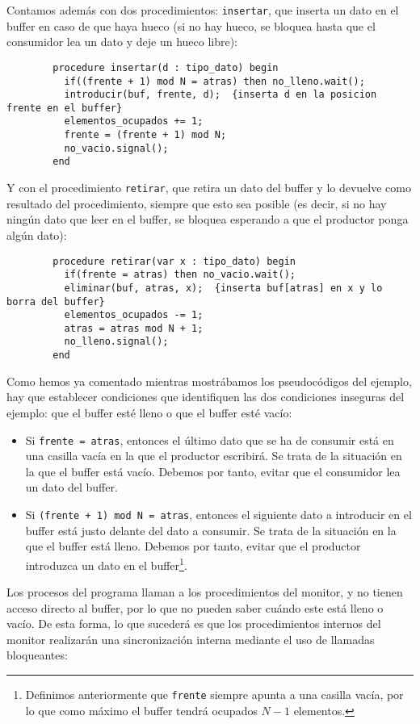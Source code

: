 \begin{ejemplo}
    Contamos además con dos procedimientos: \verb|insertar|, que inserta un dato en el buffer en caso de que haya hueco (si no hay hueco, se bloquea hasta que el consumidor lea un dato y deje un hueco libre):
    \begin{verbatim}
        procedure insertar(d : tipo_dato) begin
          if((frente + 1) mod N = atras) then no_lleno.wait();
          introducir(buf, frente, d);  {inserta d en la posicion frente en el buffer}
          elementos_ocupados += 1;
          frente = (frente + 1) mod N;
          no_vacio.signal();
        end
    \end{verbatim}
    Y con el procedimiento \verb|retirar|, que retira un dato del buffer y lo devuelve como resultado del procedimiento, siempre que esto sea posible (es decir, si no hay ningún dato que leer en el buffer, se bloquea esperando a que el productor ponga algún dato):
    \begin{verbatim}
        procedure retirar(var x : tipo_dato) begin
          if(frente = atras) then no_vacio.wait();
          eliminar(buf, atras, x);  {inserta buf[atras] en x y lo borra del buffer}
          elementos_ocupados -= 1;
          atras = atras mod N + 1;
          no_lleno.signal();
        end
    \end{verbatim}
    Como hemos ya comentado mientras mostrábamos los pseudocódigos del ejemplo, hay que establecer condiciones que identifiquen las dos condiciones inseguras del ejemplo: que el buffer esté lleno o que el buffer esté vacío:
    \begin{itemize}
        \item Si \verb|frente = atras|, entonces el último dato que se ha de consumir está en una casilla vacía en la que el productor escribirá. Se trata de la situación en la que el buffer está vacío. Debemos por tanto, evitar que el consumidor lea un dato del buffer.
        \item Si \verb|(frente + 1) mod N = atras|, entonces el siguiente dato a introducir en el buffer está justo delante del dato a consumir. Se trata de la situación en la que el buffer está lleno. Debemos por tanto, evitar que el productor introduzca un dato en el buffer\footnote{Definimos anteriormente que \texttt{frente} siempre apunta a una casilla vacía, por lo que como máximo el buffer tendrá ocupados $N-1$ elementos.}.
    \end{itemize}
    Los procesos del programa llaman a los procedimientos del monitor, y no tienen acceso directo al buffer, por lo que no pueden saber cuándo este está lleno o vacío. De esta forma, lo que sucederá es que los procedimientos internos del monitor realizarán una sincronización interna mediante el uso de llamadas bloqueantes:

\end{ejemplo}
